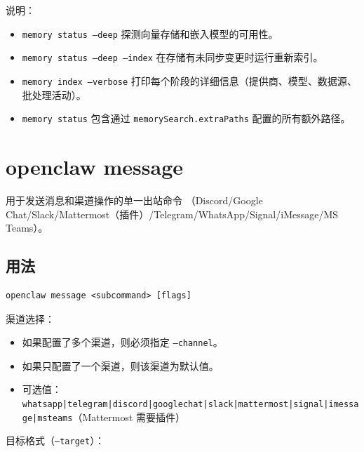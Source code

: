 说明：

\begin{itemize}
  \item \texttt{memory status --deep} 探测向量存储和嵌入模型的可用性。
  \item \texttt{memory status --deep --index} 在存储有未同步变更时运行重新索引。
  \item \texttt{memory index --verbose} 打印每个阶段的详细信息（提供商、模型、数据源、批处理活动）。
  \item \texttt{memory status} 包含通过 \texttt{memorySearch.extraPaths} 配置的所有额外路径。
\end{itemize}



\clearpage

\section{openclaw message}


用于发送消息和渠道操作的单一出站命令
（Discord/Google Chat/Slack/Mattermost（插件）/Telegram/WhatsApp/Signal/iMessage/MS Teams）。

\subsection{用法}


\begin{lstlisting}
openclaw message <subcommand> [flags]
\end{lstlisting}


渠道选择：

\begin{itemize}
  \item 如果配置了多个渠道，则必须指定 \texttt{--channel}。
  \item 如果只配置了一个渠道，则该渠道为默认值。
  \item 可选值：\texttt{whatsapp|telegram|discord|googlechat|slack|mattermost|signal|imessage|msteams}（Mattermost 需要插件）
\end{itemize}


目标格式（\texttt{--target}）：

